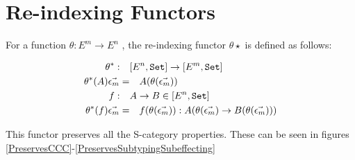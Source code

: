 \documentclass{report}
\begin{document}
\section{Re-indexing Functors}
\label{ReindexingFunctorProperties}
For a function $\theta: E^m \rightarrow E^n$ , the re-indexing functor $\theta\star$ is defined as follows:

\begin{align*}
    \theta^*:\quad& [E^n, \texttt{Set}] \rightarrow [E^m, \texttt{Set}]\\
    \theta^*(A)\vec{\epsilon_m}=&\quad A(\theta (\vec{\epsilon_m}))\\
    f:\quad& A \rightarrow B \in[E^n, \texttt{Set}]\\
    \theta^*(f)\vec{\epsilon_m} =&\quad f(\theta(\vec{\epsilon_m})): A(\theta(\vec{\epsilon_m})\rightarrow B(\theta(\vec{\epsilon_m})))
\end{align*}

This functor preserves all the S-category properties.
These can be seen in figures \ref{PreservesCCC}-\ref{PreservesSubtypingSubeffecting}
\end{document}
